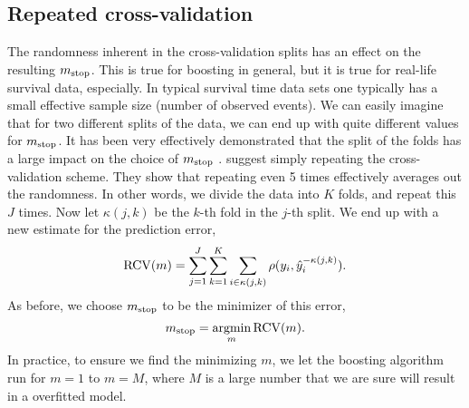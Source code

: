 \subsection{Repeated cross-validation}
The randomness inherent in the cross-validation splits has an effect on the resulting $m_{\text{stop}}$. This is true for boosting in general, but it is true for real-life survival data, especially. In typical survival time data sets one typically has a small effective sample size (number of observed events). We can easily imagine that for two different splits of the data, we can end up with quite different values for $m_{\text{stop}}$.
It has been very effectively demonstrated that the split of the folds has a large impact on the choice of $m_{\text{stop}}$ \citep{seibold}. \citet{seibold} suggest simply repeating the cross-validation scheme. They show that repeating even 5 times effectively averages out the randomness.  In other words, we divide the data into $K$ folds, and repeat this $J$ times. Now let $\kappa(j, k)$ be the $k$-th fold in the $j$-th split. We end up with a new estimate for the prediction error,
\begin{equation}
    \operatorname{RCV}(m)=\sum_{j=1}^J\sum_{k=1}^K\sum_{i\in\kappa(j,k)}\rho(y_i,\hat{y}_i^{-\kappa(j,k)}).
\end{equation}
As before, we choose $m_{\text{stop}}$ to be the minimizer of this error,
\begin{equation}
    m_{\text{stop}}=\operatorname*{argmin}_{m}\operatorname{RCV}(m).
\end{equation}
In practice, to ensure we find the minimizing $m$, we let the boosting algorithm run for $m=1$ to $m=M$, where $M$ is a large number that we are sure will result in a overfitted model.


